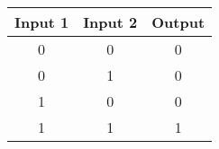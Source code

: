 
\begin{tabular}{ |c|c|c| }
\hline
\rowcolor{gray!60}
	Input 1 & Input 2 & Output \\
	\hline
	0 & 0 & 0 \\
	\hline
	0 & 1 & 0 \\
	\hline
	1 & 0 & 0 \\
	\hline
	1 & 1 & 1 \\
	\hline
\end{tabular}

